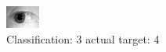 \begin{figure}[h!]
\begin{center}
\includegraphics[width=0.60\columnwidth]{figures/ID1215_class_3_target_4.png}
\end{center}
\caption{ Classification: 3 actual target: 4}
\label{fig:ID1215_class_3_target_4}
\end{figure}
